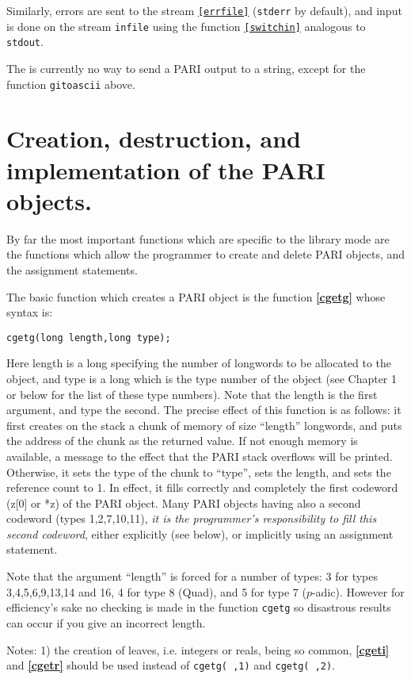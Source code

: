 Similarly, errors are sent to the stream {\tt \ref{errfile}} ({\tt stderr}
by default), and input is done on the stream {\tt infile} using the function 
{\tt \ref{switchin}} analogous to {\tt stdout}.

The is currently no way to send a PARI output to a string, except for the
function {\tt gitoascii} above.

\section{Creation, destruction, and implementation of the PARI objects.}

By far the most important functions which are specific to the library mode
are the functions which allow the programmer to create and delete PARI objects,
and the assignment statements.

The basic function which creates a PARI object is the function
{\bf \ref{cgetg}} whose syntax is:

 {\tt cgetg(long length,long type);}

Here length is a long specifying the number of longwords to be allocated to
the object, and type is a long which is the type number of the object
(see Chapter 1 or below for the list of these
type numbers). Note that the length is the first argument, and type the second.
The precise effect of this function is as follows: it first creates on the stack
a chunk of memory of size ``length'' longwords, and puts the address of the chunk
as the returned value.
If not enough memory is available, a message to the effect that the PARI stack
overflows will be printed. Otherwise, it sets the type of the chunk to ``type'',
sets the length, and sets the reference count to 1. In effect, it fills
correctly and completely the first codeword (z[0] or *z) of the PARI object.
Many PARI objects having also a second codeword (types 1,2,7,10,11),
{\it it is the programmer's responsibility to fill this second codeword\/},
either explicitly (see below), or implicitly using an assignment statement.

Note that the argument ``length'' is forced for a number of types:
3 for types 3,4,5,6,9,13,14 and 16, 4 for type 8 (Quad), and 5 for type 7 ($p$-adic).
However for efficiency's sake no checking is made in the function {\tt cgetg} so
disastrous results can occur if you give an incorrect length.

Notes: 1) the creation of leaves, i.e. integers or reals, being so common,
{\bf \ref{cgeti}} and {\bf \ref{cgetr}} should be used instead of 
{\tt cgetg( ,1)} and {\tt cgetg( ,2)}.

